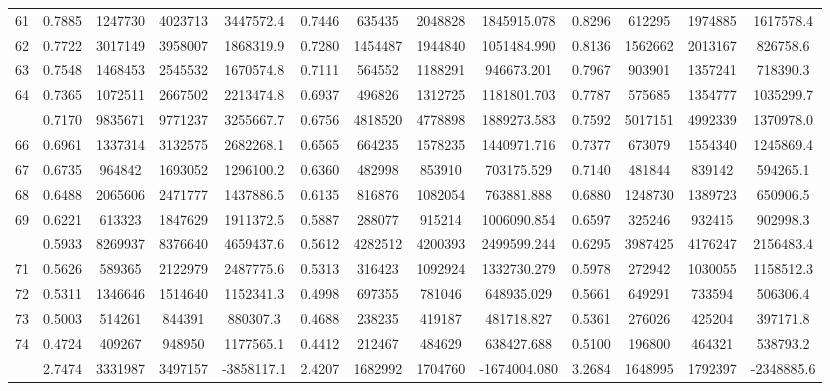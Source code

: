 \documentclass[
  12pt,
]{article}
\begin{document}
\begin{longtable}[t]{lcccccccccccc}
61 & 0.7885 & 1247730 & 4023713 & 3447572.4 & 0.7446 & 635435 & 2048828 & 1845915.078 & 0.8296 & 612295 & 1974885 & 1617578.4\\
62 & 0.7722 & 3017149 & 3958007 & 1868319.9 & 0.7280 & 1454487 & 1944840 & 1051484.990 & 0.8136 & 1562662 & 2013167 & 826758.6\\
63 & 0.7548 & 1468453 & 2545532 & 1670574.8 & 0.7111 & 564552 & 1188291 & 946673.201 & 0.7967 & 903901 & 1357241 & 718390.3\\
64 & 0.7365 & 1072511 & 2667502 & 2213474.8 & 0.6937 & 496826 & 1312725 & 1181801.703 & 0.7787 & 575685 & 1354777 & 1035299.7\\
\addlinespace
65 & 0.7170 & 9835671 & 9771237 & 3255667.7 & 0.6756 & 4818520 & 4778898 & 1889273.583 & 0.7592 & 5017151 & 4992339 & 1370978.0\\
66 & 0.6961 & 1337314 & 3132575 & 2682268.1 & 0.6565 & 664235 & 1578235 & 1440971.716 & 0.7377 & 673079 & 1554340 & 1245869.4\\
67 & 0.6735 & 964842 & 1693052 & 1296100.2 & 0.6360 & 482998 & 853910 & 703175.529 & 0.7140 & 481844 & 839142 & 594265.1\\
68 & 0.6488 & 2065606 & 2471777 & 1437886.5 & 0.6135 & 816876 & 1082054 & 763881.888 & 0.6880 & 1248730 & 1389723 & 650906.5\\
69 & 0.6221 & 613323 & 1847629 & 1911372.5 & 0.5887 & 288077 & 915214 & 1006090.854 & 0.6597 & 325246 & 932415 & 902998.3\\
\addlinespace
70 & 0.5933 & 8269937 & 8376640 & 4659437.6 & 0.5612 & 4282512 & 4200393 & 2499599.244 & 0.6295 & 3987425 & 4176247 & 2156483.4\\
71 & 0.5626 & 589365 & 2122979 & 2487775.6 & 0.5313 & 316423 & 1092924 & 1332730.279 & 0.5978 & 272942 & 1030055 & 1158512.3\\
72 & 0.5311 & 1346646 & 1514640 & 1152341.3 & 0.4998 & 697355 & 781046 & 648935.029 & 0.5661 & 649291 & 733594 & 506306.4\\
73 & 0.5003 & 514261 & 844391 & 880307.3 & 0.4688 & 238235 & 419187 & 481718.827 & 0.5361 & 276026 & 425204 & 397171.8\\
74 & 0.4724 & 409267 & 948950 & 1177565.1 & 0.4412 & 212467 & 484629 & 638427.688 & 0.5100 & 196800 & 464321 & 538793.2\\
\addlinespace
75 & 2.7474 & 3331987 & 3497157 & -3858117.1 & 2.4207 & 1682992 & 1704760 & -1674004.080 & 3.2684 & 1648995 & 1792397 & -2348885.6\\*
\end{longtable}
\endgroup{}
\end{document}

